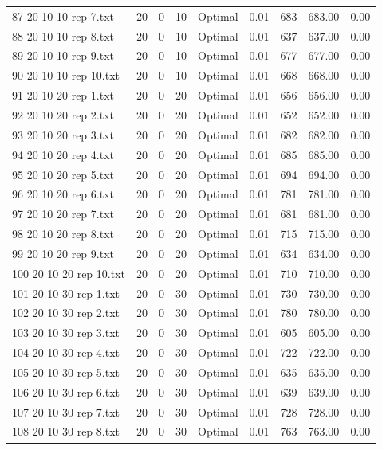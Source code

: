 \begin{longtable}{lrrllrrrr}
87 20 10 10 rep 7.txt & 20 & 0 & 10 & Optimal &  0.01 & 683 & 683.00 &  0.00\\
88 20 10 10 rep 8.txt & 20 & 0 & 10 & Optimal &  0.01 & 637 & 637.00 &  0.00\\
89 20 10 10 rep 9.txt & 20 & 0 & 10 & Optimal &  0.01 & 677 & 677.00 &  0.00\\
90 20 10 10 rep 10.txt & 20 & 0 & 10 & Optimal &  0.01 & 668 & 668.00 &  0.00\\
91 20 10 20 rep 1.txt & 20 & 0 & 20 & Optimal &  0.01 & 656 & 656.00 &  0.00\\
92 20 10 20 rep 2.txt & 20 & 0 & 20 & Optimal &  0.01 & 652 & 652.00 &  0.00\\
93 20 10 20 rep 3.txt & 20 & 0 & 20 & Optimal &  0.01 & 682 & 682.00 &  0.00\\
94 20 10 20 rep 4.txt & 20 & 0 & 20 & Optimal &  0.01 & 685 & 685.00 &  0.00\\
95 20 10 20 rep 5.txt & 20 & 0 & 20 & Optimal &  0.01 & 694 & 694.00 &  0.00\\
96 20 10 20 rep 6.txt & 20 & 0 & 20 & Optimal &  0.01 & 781 & 781.00 &  0.00\\
97 20 10 20 rep 7.txt & 20 & 0 & 20 & Optimal &  0.01 & 681 & 681.00 &  0.00\\
98 20 10 20 rep 8.txt & 20 & 0 & 20 & Optimal &  0.01 & 715 & 715.00 &  0.00\\
99 20 10 20 rep 9.txt & 20 & 0 & 20 & Optimal &  0.01 & 634 & 634.00 &  0.00\\
100 20 10 20 rep 10.txt & 20 & 0 & 20 & Optimal &  0.01 & 710 & 710.00 &  0.00\\
101 20 10 30 rep 1.txt & 20 & 0 & 30 & Optimal &  0.01 & 730 & 730.00 &  0.00\\
102 20 10 30 rep 2.txt & 20 & 0 & 30 & Optimal &  0.01 & 780 & 780.00 &  0.00\\
103 20 10 30 rep 3.txt & 20 & 0 & 30 & Optimal &  0.01 & 605 & 605.00 &  0.00\\
104 20 10 30 rep 4.txt & 20 & 0 & 30 & Optimal &  0.01 & 722 & 722.00 &  0.00\\
105 20 10 30 rep 5.txt & 20 & 0 & 30 & Optimal &  0.01 & 635 & 635.00 &  0.00\\
106 20 10 30 rep 6.txt & 20 & 0 & 30 & Optimal &  0.01 & 639 & 639.00 &  0.00\\
107 20 10 30 rep 7.txt & 20 & 0 & 30 & Optimal &  0.01 & 728 & 728.00 &  0.00\\
108 20 10 30 rep 8.txt & 20 & 0 & 30 & Optimal &  0.01 & 763 & 763.00 &  0.00\\

\end{longtable}
